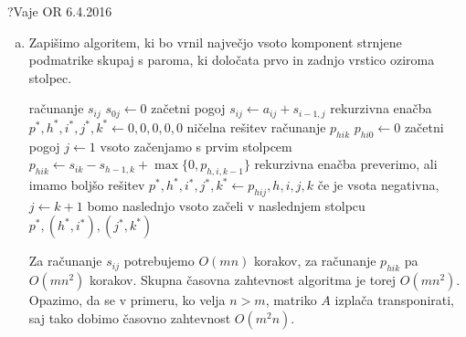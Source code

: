 \begin{naloga}{?}{Vaje OR 6.4.2016}
\begin{odgovor}
\begin{enumerate}[(a)]
\item Zapišimo algoritem,
ki bo vrnil največjo vsoto komponent strnjene podmatrike skupaj s paroma,
ki določata prvo in zadnjo vrstico oziroma stolpec.
\begin{small}
\begin{algorithmic}
     \hfill računanje $s_{ij}$
        \State $s_{0j} \gets 0$ \hfill začetni pogoj
            \State $s_{ij} \gets a_{ij} + s_{i-1,j}$ \hfill rekurzivna enačba
        \EndFor
    \EndFor
    \State $p^*, h^*, i^*, j^*, k^* \gets 0, 0, 0, 0, 0$
        \hfill ničelna rešitev
     \hfill računanje $p_{hik}$
            \State $p_{hi0} \gets 0$ \hfill začetni pogoj
            \State $j \gets 1$ \hfill vsoto začenjamo s prvim stolpcem
                \State $p_{hik} \gets s_{ik} - s_{h-1,k}
                                    + \max\{0, p_{h,i,k-1}\}$
                    \hfill rekurzivna enačba
                        \hfill preverimo, ali imamo boljšo rešitev
                    \State $p^*, h^*, i^*, j^*, k^* \gets p_{hij}, h, i, j, k$
                 \hfill če je vsota negativna,
                    \State $j \gets k+1$ \hfill
                        bomo naslednjo vsoto začeli v naslednjem stolpcu
                \EndIf
            \EndFor
        \EndFor
    \EndFor
    \State \Return $p^*, (h^*, i^*), (j^*, k^*)$
\EndFunction
\end{algorithmic}
\end{small}
Za računanje $s_{ij}$ potrebujemo $O(mn)$ korakov,
za računanje $p_{hik}$ pa $O(mn^2)$ korakov.
Skupna časovna zahtevnost algoritma je torej $O(mn^2)$.
Opazimo, da se v primeru, ko velja $n > m$,
matriko $A$ izplača transponirati,
saj tako dobimo časovno zahtevnost $O(m^2 n)$.
\end{enumerate}
\end{odgovor}
\end{naloga}
